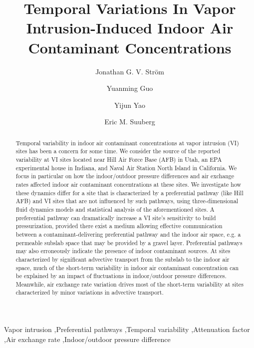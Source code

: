 \documentclass[preprint,12pt]{elsarticle}
\begin{document}
\begin{frontmatter}
\title{Temporal Variations In Vapor Intrusion-Induced Indoor Air Contaminant Concentrations}

\author[Brown]{Jonathan G. V. Ström}
\author[ASU]{Yuanming Guo}
\author[ASU]{Yijun Yao}
\author[Brown]{Eric M. Suuberg}


\address[Brown]{Brown University, School of Engineering, Providence, RI, USA}
\address[ASU]{Arizona State University, School of Sustainable Engineering and the Building Environment, Tempe, AZ, USA}

\begin{abstract}
Temporal variability in indoor air contaminant concentrations at vapor intrusion (VI) sites has been a concern for some time.
We consider the source of the reported variability at VI sites located near Hill Air Force Base (AFB) in Utah, an EPA experimental house in Indiana, and Naval Air Station North Island in California.
We focus in particular on how the indoor/outdoor pressure differences and air exchange rates affected indoor air contaminant concentrations at these sites.
We investigate how these dynamics differ for a site that is characterized by a preferential pathway (like Hill AFB) and VI sites that are not influenced by such pathways, using three-dimensional fluid dynamics models and statistical analysis of the aforementioned sites.
A preferential pathway can dramatically increase a VI site's sensitivity to build pressurization, provided there exist a medium allowing effective communication between a contaminant-delivering preferential pathway and the indoor air space, e.g. a permeable subslab space that may be provided by a gravel layer.
Preferential pathways may also erroneously indicate the presence of indoor contaminant sources.
At sites characterized by significant advective transport from the subslab to the indoor air space, much of the short-term variability in indoor air contaminant concentration can be explained by an impact of fluctuations in indoor/outdoor pressure differences.
Meanwhile, air exchange rate variation drives most of the short-term variability at sites characterized by minor variations in advective transport.
\end{abstract}

\begin{keyword}
  Vapor intrusion \sep Preferential pathways \sep Temporal variability \sep Attenuation factor \sep Air exchange rate \sep Indoor/outdoor pressure difference
\end{keyword}

\end{frontmatter}
\end{document}

